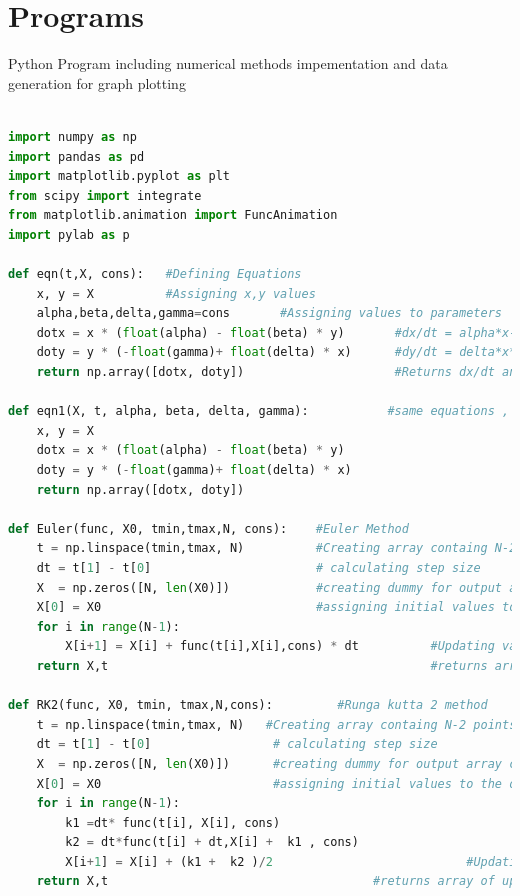 \documentclass[12pt]{article}
\begin{document}
\section{Programs}
Python Program including numerical methods impementation and data generation for graph plotting
\begin{lstlisting}[language=Python, caption=Python example]

import numpy as np
import pandas as pd
import matplotlib.pyplot as plt
from scipy import integrate
from matplotlib.animation import FuncAnimation 
import pylab as p

def eqn(t,X, cons):   #Defining Equations 
    x, y = X          #Assigning x,y values 
    alpha,beta,delta,gamma=cons       #Assigning values to parameters 
    dotx = x * (float(alpha) - float(beta) * y)       #dx/dt = alpha*x-beta*x*y
    doty = y * (-float(gamma)+ float(delta) * x)      #dy/dt = delta*x*y-gamma*y
    return np.array([dotx, doty])                     #Returns dx/dt and dy/dt in array 

def eqn1(X, t, alpha, beta, delta, gamma):           #same equations , but taking alpha,beta,delta,gamma parameters as input instead of array
    x, y = X                                         
    dotx = x * (float(alpha) - float(beta) * y)
    doty = y * (-float(gamma)+ float(delta) * x)
    return np.array([dotx, doty])

def Euler(func, X0, tmin,tmax,N, cons):    #Euler Method
    t = np.linspace(tmin,tmax, N)          #Creating array containg N-2 points between tmin and tmax (Basically calculation points)
    dt = t[1] - t[0]                       # calculating step size
    X  = np.zeros([N, len(X0)])            #creating dummy for output array containing x,y values
    X[0] = X0                              #assigning initial values to the output array
    for i in range(N-1):
        X[i+1] = X[i] + func(t[i],X[i],cons) * dt          #Updating values of the dummy array that we created 
    return X,t                                             #returns array of updated values of X and array t

def RK2(func, X0, tmin, tmax,N,cons):         #Runga kutta 2 method
    t = np.linspace(tmin,tmax, N)   #Creating array containg N-2 points between tmin and tmax (Basically calculation points)
    dt = t[1] - t[0]                 # calculating step size
    X  = np.zeros([N, len(X0)])      #creating dummy for output array containing x,y values
    X[0] = X0                        #assigning initial values to the output array
    for i in range(N-1):
        k1 =dt* func(t[i], X[i], cons)
        k2 = dt*func(t[i] + dt,X[i] +  k1 , cons)
        X[i+1] = X[i] + (k1 +  k2 )/2                           #Updating values of the dummy array that we created 
    return X,t                                     #returns array of updated values of X and array t


\end{lstlisting}
\end{document}
